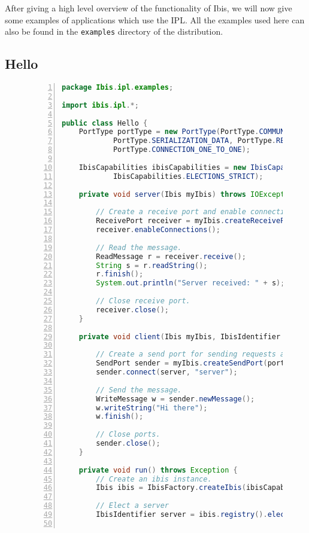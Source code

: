 After giving a high level overview of the functionality of Ibis, we will
now give some examples of applications which use the IPL. All the
examples used here can also be found in the \texttt{examples} directory
of the distribution. 

\subsection{Hello}
\begin{figure}[p]
\begin{lstlisting}[language=Java,numbers=left, numbersep=3pt]
package Ibis.ipl.examples;

import ibis.ipl.*;

public class Hello {
    PortType portType = new PortType(PortType.COMMUNICATION_RELIABLE,
            PortType.SERIALIZATION_DATA, PortType.RECEIVE_EXPLICIT,
            PortType.CONNECTION_ONE_TO_ONE);

    IbisCapabilities ibisCapabilities = new IbisCapabilities(
            IbisCapabilities.ELECTIONS_STRICT);

    private void server(Ibis myIbis) throws IOException {

        // Create a receive port and enable connections.
        ReceivePort receiver = myIbis.createReceivePort(portType, "server");
        receiver.enableConnections();

        // Read the message.
        ReadMessage r = receiver.receive();
        String s = r.readString();
        r.finish();
        System.out.println("Server received: " + s);

        // Close receive port.
        receiver.close();
    }

    private void client(Ibis myIbis, IbisIdentifier server) throws IOException {

        // Create a send port for sending requests and connect.
        SendPort sender = myIbis.createSendPort(portType);
        sender.connect(server, "server");

        // Send the message.
        WriteMessage w = sender.newMessage();
        w.writeString("Hi there");
        w.finish();

        // Close ports.
        sender.close();
    }

    private void run() throws Exception {
        // Create an ibis instance.
        Ibis ibis = IbisFactory.createIbis(ibisCapabilities, null, portType);

        // Elect a server
        IbisIdentifier server = ibis.registry().elect("Server");


\end{lstlisting}
\end{figure}
